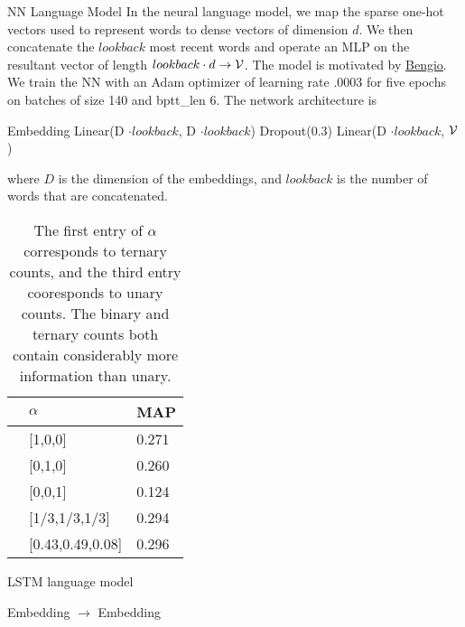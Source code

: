 \documentclass[11pt]{article}
\begin{document}
\begin{subsection}{NN Language Model}
In the neural language model, we map the sparse one-hot vectors used to represent words to dense vectors of dimension $d$. We then concatenate the $lookback$ most recent words and operate an MLP on the resultant vector of length $lookback \cdot d \rightarrow \mathcal{V}$. The model is motivated by \href{http://www.jmlr.org/papers/volume3/bengio03a/bengio03a.pdf}{Bengio}.\\
We train the NN with an Adam optimizer of learning rate .0003 for five epochs on batches of size 140 and bptt\_len 6. The network architecture is\\
\centerline{ Embedding \rightarrow Linear(D $\cdot lookback$, D $\cdot lookback$) \rightarrow Dropout(0.3) \rightarrow Linear(D $\cdot lookback$, $\mathcal{V}$) }
where $D$ is the dimension of the embeddings, and $lookback$ is the number of words that are concatenated.

\begin{table}
  \begin{center}
    \begin{tabular}{@{}lll@{}}
      \toprule
      & $\alpha$ & MAP\\
      \midrule
      & [1,0,0] & 0.271 \\
      & [0,1,0] & 0.260 \\
      & [0,0,1] & 0.124 \\
      & [1/3,1/3,1/3] & 0.294 \\
      & [0.43,0.49,0.08] & 0.296\\
      \bottomrule
    \end{tabular}
  \end{center}
  \caption{\label{tab:NN} The first entry of $\alpha$ corresponds to ternary counts, and the third entry cooresponds to unary counts. The binary and ternary counts both contain considerably more information than unary.}
 \end{table}

\end{subsection}

\begin{subsection}{LSTM language model}




\end{subsection}


\begin{subsection}{Embedding $\rightarrow$ Embedding}



\end{subsection}
\end{document}
